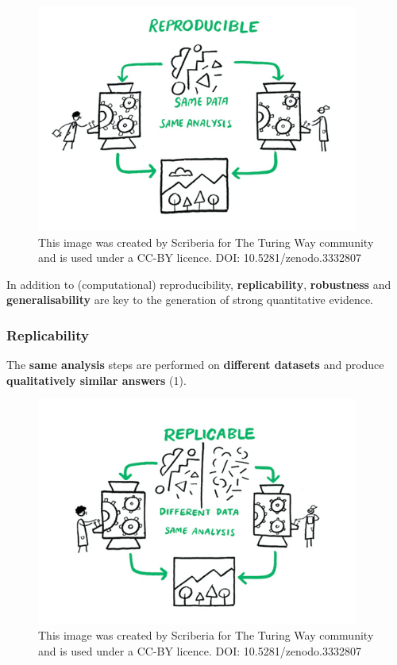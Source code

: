 \documentclass[
  letterpaper,
  DIV=11,
  numbers=noendperiod]{scrreprt}
\begin{document}
\begin{figure}

{\centering \includegraphics[width=4.16667in,height=\textheight]{./images/paste-97E0048A.png}

}

\caption{\label{fig-reproducibility}This image was created by Scriberia
for The Turing Way community and is used under a CC-BY licence. DOI:
10.5281/zenodo.3332807}

\end{figure}

In addition to (computational) reproducibility, \textbf{replicability},
\textbf{robustness} and \textbf{generalisability} are key to the
generation of strong quantitative evidence.

\hypertarget{replicability}{%
\subsubsection{Replicability}\label{replicability}}

The \textbf{same analysis} steps are performed on \textbf{different
datasets} and produce \textbf{qualitatively similar answers} (1).

\begin{figure}

{\centering \includegraphics[width=4.16667in,height=\textheight]{./images/paste-5D367441.png}

}

\caption{\label{fig-replicability}This image was created by Scriberia
for The Turing Way community and is used under a CC-BY licence. DOI:
10.5281/zenodo.3332807}

\end{figure}
\end{document}

